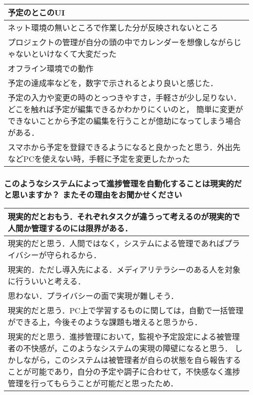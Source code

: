 \begin{table}[htb]
  \begin{tabular}{p{14cm}} \hline
    予定のとこのUI \\ \hline
    ネット環境の無いところで作業した分が反映されないところ \\ \hline
    プロジェクトの管理が自分の頭の中でカレンダーを想像しながらじゃないといけなくて大変だった \\ \hline
    オフライン環境での動作 \\ \hline
    予定の達成率などを，数字で示されるとより良いと感じた． \\ \hline
    予定の入力や変更の時のとっつきやすさ，手軽さが少し足りない．どこを触れば予定が編集できるかわかりにくいのと，
    簡単に変更ができないことから予定の編集を行うことが億劫になってしまう場合がある． \\ \hline
    スマホから予定を登録できるようになると良かったと思う．外出先などPCを使えない時，手軽に予定を変更したかった \\ \hline
  \end{tabular}
\end{table}

\clearpage

\subsubsection*{このようなシステムによって進捗管理を自動化することは現実的だと思いますか？ またその理由をお聞かせください}

\begin{table}[htb]
  \begin{tabular}{p{14cm}} \hline
    現実的だとおもう．それぞれタスクが違うって考えるのが現実的で人間か管理するのには限界がある． \\ \hline
    現実的だと思う．人間ではなく，システムによる管理であればプライバシーが守られるから． \\ \hline
    現実的．ただし導入先による．メディアリテラシーのある人を対象に行ういいと考える． \\ \hline
    思わない．プライバシーの面で実現が難しそう． \\ \hline
    現実的だと思う．PC上で学習するものに関しては，自動で一括管理ができる上，今後そのような課題も増えると思うから． \\ \hline
    現実的だと思う．進捗管理において，監視や予定設定による被管理者の不快感が，このようなシステムの実現の障壁になると思う．
    しかしながら，このシステムは被管理者が自らの状態を自ら報告することが可能であり，自分の予定や調子に合わせて，不快感なく進捗管理を行ってもらうことが可能だと思ったため．\\ \hline
  \end{tabular}
\end{table}
